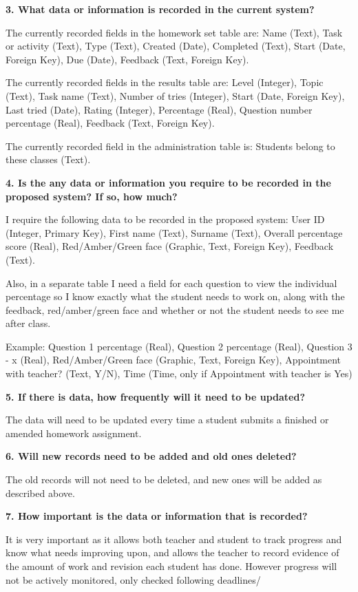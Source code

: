 \textbf{3. What data or information is recorded in the current system?}

The currently recorded fields in the homework set table are: Name (Text), Task or activity (Text), Type (Text), Created (Date), Completed (Text), Start (Date, Foreign Key), Due (Date), Feedback (Text, Foreign Key).

The currently recorded fields in the results table are: Level (Integer), Topic (Text), Task name (Text), Number of tries (Integer), Start (Date, Foreign Key), Last tried (Date), Rating (Integer), Percentage (Real), Question number percentage (Real), Feedback (Text, Foreign Key).

The currently recorded field in the administration table is: Students belong to these classes (Text).

\textbf{4. Is the any data or information you require to be recorded in the proposed system? If so, how much?}

I require the following data to be recorded in the proposed system: User ID (Integer, Primary Key), First name (Text), Surname (Text), Overall percentage score (Real), Red/Amber/Green face (Graphic, Text, Foreign Key), Feedback (Text).

Also, in a separate table I need a field for each question to view the individual percentage so I know exactly what the student needs to work on, along with the feedback, red/amber/green face and whether or not the student needs to see me after class. 

Example: Question 1 percentage (Real), Question 2 percentage (Real), Question 3 - x (Real), Red/Amber/Green face (Graphic, Text, Foreign Key), Appointment with teacher? (Text, Y/N), Time (Time, only if Appointment with teacher is Yes)

\textbf{5. If there is data, how frequently will it need to be updated?}

The data will need to be updated every time a student submits a finished or amended homework assignment.

\textbf{6. Will new records need to be added and old ones deleted?}

The old records will not need to be deleted, and new ones will be added as described above.

\textbf{7. How important is the data or information that is recorded?}

It is very important as it allows both teacher and student to track progress and know what needs improving upon, and allows the teacher to record evidence of the amount of work and revision each student has done. However progress will not be actively monitored, only checked following deadlines/

